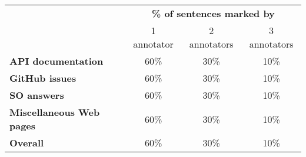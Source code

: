 \begin{table}[H]
\centering    
\caption{}
\label{tbl:corpus-annotation-overlap}
\begin{scriptsize}
\begin{threeparttable}
\begin{tabular}{lccc}





& \multicolumn{3}{c}{\textbf{\% of sentences marked by}}
\\ \cmidrule(l){2-4} 
& 1 annotator & 2 annotators & 3 annotators  \\

\hline

\textbf{API documentation} 
& 60\% & 30\% & 10\%
\\
\textbf{GitHub issues} 
& 60\% & 30\% & 10\%
\\
\textbf{SO answers} 
& 60\% & 30\% & 10\%
\\
\textbf{Miscellaneous Web pages} 
& 60\% & 30\% & 10\%
\\

\hline
\textbf{Overall} 
& 60\% & 30\% & 10\%
\\
\hline

\end{tabular}
\end{threeparttable}
\end{scriptsize}
\end{table}

